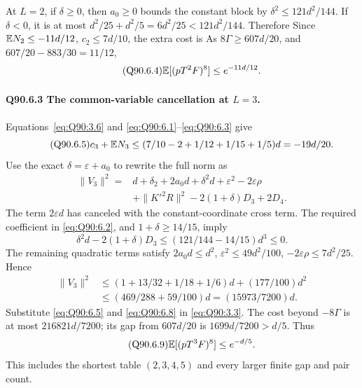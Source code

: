 At \(L=\allowbreak 2\), if \(\delta\ge\allowbreak 0\), then \(a_0\ge\allowbreak 0\) bounds the
constant block by \(\delta^2\le\allowbreak 121d^2/144\).
If \(\delta<\allowbreak 0\), it is at most
\(d^2/25+d^2/5=\allowbreak 6d^2/25<\allowbreak 121d^2/144\).
Therefore
Since \(\mathbb E N_2\le\allowbreak -11d/12\), \(c_2\le\allowbreak 7d/10\), the extra cost is
As \(8\Gamma\ge\allowbreak 607d/20\), and \(607/20-883/30=\allowbreak 11/12\),
\begin{equation}\tag{Q90.6.4}\label{eq:Q90:6.4}
\mathbb E[(pT^2F)^8]\le e^{-11d/12}.
\end{equation}

\paragraph{Q90.6.3 The common-variable cancellation at \(L=\allowbreak 3\).}
Equations~\eqref{eq:Q90:3.6} and
\eqref{eq:Q90:6.1}--\eqref{eq:Q90:6.3} give
\begin{equation}\tag{Q90.6.5}\label{eq:Q90:6.5}
c_3+\mathbb E N_3\le(7/10-2+1/12+1/15+1/5)d=-19d/20.
\end{equation}
Use the exact \(\delta=\allowbreak \varepsilon+a_0\) to rewrite the full norm as
\begin{equation}\tag{Q90.6.6}\label{eq:Q90:6.6}
\begin{aligned}
\|V_3\|^2={}&d+\delta_2+2a_0d+\delta^2d
 +\varepsilon^2-2\varepsilon\rho\\
 &+\|K'^2R\|^2-2(1+\delta)D_3+2D_4.
\end{aligned}
\end{equation}
The term \(2\varepsilon d\) has canceled with the constant-coordinate
cross term. The required coefficient in \eqref{eq:Q90:6.2}, and
\(1+\delta\ge\allowbreak 14/15\), imply
\begin{equation}\tag{Q90.6.7}\label{eq:Q90:6.7}
\delta^2d-2(1+\delta)D_3
\le(121/144-14/15)d^3\le0.
\end{equation}
The remaining quadratic terms satisfy
\(2a_0d\le\allowbreak  d^2\), \(\varepsilon^2\le\allowbreak 49d^2/100\),
\(-2\varepsilon\rho\le\allowbreak 7d^2/25\). Hence
\begin{equation}\tag{Q90.6.8}\label{eq:Q90:6.8}
\begin{aligned}
\|V_3\|^2&\le(1+13/32+1/18+1/6)d+(177/100)d^2\\
&\le(469/288+59/100)d=(15973/7200)d.
\end{aligned}
\end{equation}
Substitute \eqref{eq:Q90:6.5} and \eqref{eq:Q90:6.8} in
\eqref{eq:Q90:3.3}. The cost beyond \(-8\Gamma\) is at most
\(216821d/7200\); its gap from \(607d/20\) is
\(1699d/7200>\allowbreak d/5\). Thus
\begin{equation}\tag{Q90.6.9}\label{eq:Q90:6.9}
\mathbb E[(pT^3F)^8]\le e^{-d/5}.
\end{equation}
This includes the shortest table \((2,\allowbreak 3,\allowbreak 4,\allowbreak 5)\) and every larger
finite gap and pair count.

